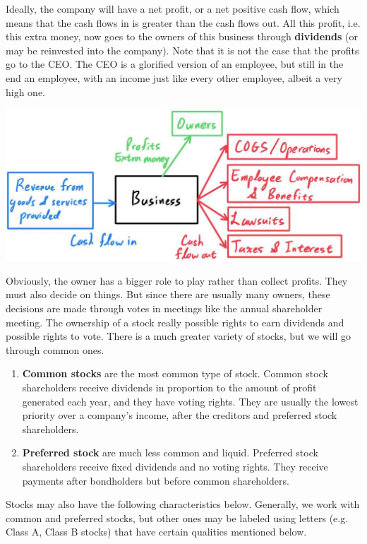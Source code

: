 \documentclass{article}
\begin{document}
  Ideally, the company will have a net profit, or a net positive cash flow, which means that the cash flows in is greater than the cash flows out. All this profit, i.e. this extra money, now goes to the owners of this business through \textbf{dividends} (or may be reinvested into the company). Note that it is not the case that the profits go to the CEO. The CEO is a glorified version of an employee, but still in the end an employee, with an income just like every other employee, albeit a very high one. 
  \begin{center}
      \includegraphics[scale=0.27]{img/Business_Cash_Flow.jpg}
  \end{center}
  Obviously, the owner has a bigger role to play rather than collect profits. They must also decide on things. But since there are usually many owners, these decisions are made through votes in meetings like the annual shareholder meeting. The ownership of a stock really possible rights to earn dividends and possible rights to vote. There is a much greater variety of stocks, but we will go through common ones.
  \begin{enumerate}
      \item \textbf{Common stocks} are the most common type of stock. Common stock shareholders receive dividends in proportion to the amount of profit generated each year, and they have voting rights. They are usually the lowest priority over a company's income, after the creditors and preferred stock shareholders. 
      \item \textbf{Preferred stock} are much less common and liquid. Preferred stock shareholders receive fixed dividends and no voting rights. They receive payments after bondholders but before common shareholders. 
  \end{enumerate}
  Stocks may also have the following characteristics below. Generally, we work with common and preferred stocks, but other ones may be labeled using letters (e.g. Class A, Class B stocks) that have certain qualities mentioned below. 
\end{document}
